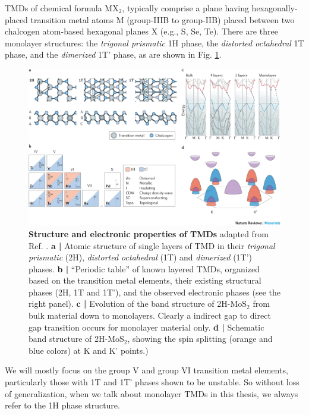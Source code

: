 TMDs of chemical formula MX$_2$, typically comprise a plane having hexagonally-placed transition metal atoms M (group-IIIB to group-IIB) placed between two chalcogen atom-based hexagonal planes X (e.g., S, Se, Te). There are three monolayer structures: the \emph{trigonal prismatic} 1H phase, the \emph{distorted octahedral} 1T phase, and the \emph{dimerized} 1T' phase, as are shown in Fig. \ref{fig:TMD_electonic_properties}.
\begin{figure}[!htp]
    \centering
    \includegraphics[width=1.0\textwidth]{figures/TMD.png}
    \caption{\textbf{Structure and electronic properties of TMDs} adapted from Ref. \cite{manzeli20172d}. \textbf{a |} Atomic structure of single layers of TMD in their \emph{trigonal prismatic} (2H), \emph{distorted octahedral} (1T) and \emph{dimerized} (1T') phases. \textbf{b |} ``Periodic table'' of known layered TMDs, organized based on the transition metal elements, their existing structural phases (2H, 1T and 1T'), and the observed electronic phases (see the right panel). \textbf{c |} Evolution of the band structure of 2H-MoS$_2$ from bulk material down to monolayers. Clearly a indirect gap to direct gap transition occurs for monolayer material only. \textbf{d |} Schematic band structure of 2H-MoS$_2$, showing the spin splitting (orange and blue colors) at K and K' points.)}
    \label{fig:TMD_electonic_properties}
\end{figure}
We will mostly focus on the group V and group VI transition metal elements, particularly those with 1T and 1T' phases shown to be unstable. So without loss of generalization, when we talk about monolayer TMDs in this thesis, we always refer to the 1H phase structure.
